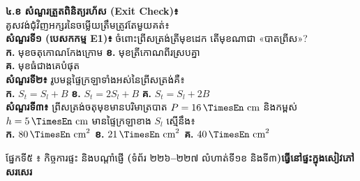 \documentclass[a4paper,10pt]{article}
\newcommand{\en}[1]{{\TimesEn #1}}
\newcommand{\enbf}[1]{{\TimesEn\textbf{#1}}}
\newcommand{\unit}[1]{\,\text{\en{#1}}}
\newcommand{\secbar}[2]{%
  \vspace{3pt}%
  \begin{tcolorbox}[
    enhanced, sharp corners, colback=headgray, colframe=black,
    boxrule=0.9pt, boxsep=1pt, top=2.5pt, bottom=2.5pt, left=6pt, right=6pt,
    after skip=3pt
  ]
    {\muol\fontsize{9.2pt}{13.5pt}\selectfont #1}\hfill{\fontsize{8.3pt}{11.5pt}\selectfont\textbf{#2}}
  \end{tcolorbox}%
}
\begin{document}
\begin{minipage}[t]{8.5cm}\vspace{0pt}
  \begin{tcolorbox}[
    enhanced, sharp corners, colback=white, colframe=black, equal height group=rowE5,
    boxrule=0.85pt, boxsep=3pt, top=5pt, bottom=5pt, left=5.5pt, right=5.5pt
  ]
    \textbf{៤.ខ សំណួរត្រួតពិនិត្យរហ័ស (\en{Exit Check})៖}\\
    គូសវង់ជុំវិញអក្សរនៃចម្លើយត្រឹមត្រូវតែមួយគត់៖\\[6pt]
    \textbf{សំណួរទី១ (បេសកកម្ម \en{E1})៖} ចំពោះព្រីសត្រង់ត្រីមុខដេក តើមុខណាជា «បាតព្រីស»?\\[2pt]
    \hspace*{0.15cm}\textbf{ក.} មុខចតុកោណកែងក្រោម \hspace{0.2cm} \textbf{ខ.} មុខត្រីកោណពីរស្របគ្នា\\
    \hspace*{0.15cm}\textbf{គ.} មុខធំជាងគេបំផុត\\[7pt]
    \textbf{សំណួរទី២៖} រូបមន្តផ្ទៃក្រឡាទាំងអស់នៃព្រីសត្រង់គឺ៖\\[2pt]
    \hspace*{0.15cm}\textbf{ក.} $S_t = S_l + B$ \hspace{0.35cm} \textbf{ខ.} $S_t = 2S_l + B$ \hspace{0.35cm} \textbf{គ.} $S_t = S_l + 2B$\\[7pt]
    \textbf{សំណួរទី៣៖} ព្រីសត្រង់ចតុមុខមានបរិមាត្របាត $P=16\unit{cm}$ និងកម្ពស់ $h=5\unit{cm}$ មានផ្ទៃក្រឡាខាង $S_l$ ស្មើនឹង៖\\[2pt]
    \hspace*{0.15cm}\textbf{ក.} $80\unit{cm}^2$ \hspace{0.55cm} \textbf{ខ.} $21\unit{cm}^2$ \hspace{0.55cm} \textbf{គ.} $40\unit{cm}^2$
  \end{tcolorbox}
\end{minipage}

\vspace{7pt}
\secbar{ផ្នែកទី៥ ៖ កិច្ចការផ្ទះ និងបណ្ដាំផ្ញើ \enbf{(}ទំព័រ ២២៦\enbf{--}២២៧ លំហាត់ទី១ខ និងទី៣\enbf{)}}{ធ្វើនៅផ្ទះក្នុងសៀវភៅសរសេរ}
\end{document}
